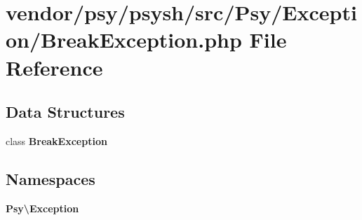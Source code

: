 \section{vendor/psy/psysh/src/\+Psy/\+Exception/\+Break\+Exception.php File Reference}
\label{_break_exception_8php}
\subsection*{Data Structures}
\begin{DoxyCompactItemize}
\item 
class {\bf Break\+Exception}
\end{DoxyCompactItemize}
\subsection*{Namespaces}
\begin{DoxyCompactItemize}
\item 
 {\bf Psy\textbackslash{}\+Exception}
\end{DoxyCompactItemize}
